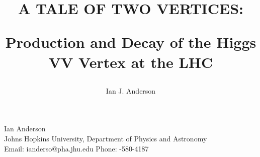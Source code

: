 \documentclass[12pt,oneside,final]{thesis}
\begin{document}
\title{
\begin{Large}
A TALE OF TWO VERTICES: \\
\end{Large}
Production and Decay of the Higgs VV Vertex at the LHC
}
\author{Ian J. Anderson}
\dissertation
\doctorphilosophy
\copyrightnotice










%





\pagebreak
\begin{cv}{{\large Ian Anderson}\\
    {\normalsize Johns Hopkins University, 
      Department of Physics and Astronomy\\
      Email: ianderso@pha.jhu.edu
      \hfill Phone: {-580-4187} 
    }
}

\end{cv}
\end{document}
